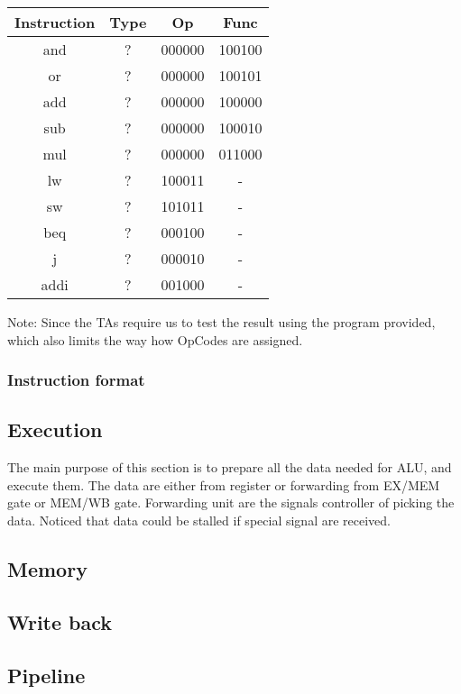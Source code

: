 \documentclass[11pt, a4paper, twoside]{article}
\begin{document}
\begin{table}[h]
	\centering
	\begin{tabular}{|c|ccc|}
	\hline
    Instruction & Type & Op & Func\\
    \hline
    and & ? & 000000 & 100100 \\
    or & ? & 000000 & 100101 \\
    add & ? & 000000 & 100000 \\
    sub & ? & 000000 & 100010 \\
    mul & ? & 000000 & 011000 \\
    lw & ? & 100011 & - \\
    sw & ? & 101011 & - \\
    beq & ? & 000100 & - \\
    j & ? & 000010 & - \\
    addi & ? & 001000 & - \\
    \hline
	\end{tabular}
\end{table}

Note: Since the TAs require us to test the result using the program provided, which also limits the way how OpCodes are assigned.\\

\subsubsection{Instruction format}

\subsection{Execution}
The main purpose of this section is to prepare all the data needed for ALU, and execute them. The data are either from register or forwarding from EX/MEM gate or MEM/WB gate. Forwarding unit are the signals controller of picking the data. Noticed that data could be stalled if special signal are received. 
\subsection{Memory}

\subsection{Write back}
\subsection{Pipeline}
	
\end{document}
